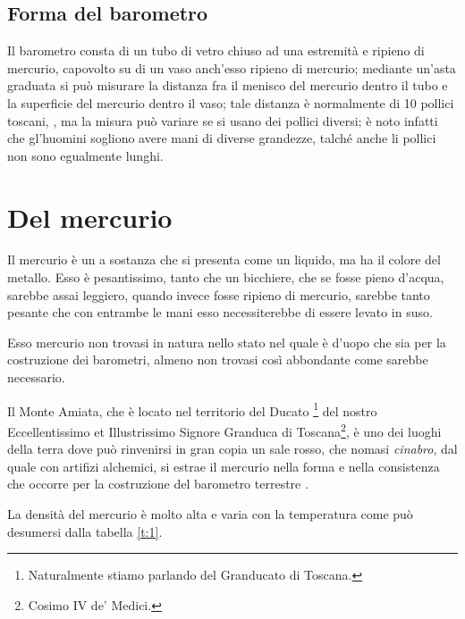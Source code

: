 \documentclass[%
corpo=12pt,
twoside,
stile=standard,
tipotesi=magistrale,
numerazioneromana,
greek,
evenboxes,
]{toptesi}
\begin{document}
{\subsection{Forma del barometro}
Il barometro consta di un tubo di vetro chiuso ad una estremit\`a e
ripieno di mercurio, capovolto su di un vaso anch'esso ripieno di
mercurio; mediante un'asta graduata si pu\`o misurare la distanza fra
il menisco del mercurio dentro il tubo e la superficie del mercurio
dentro il vaso; tale distanza \`e normalmente di 10 pollici toscani,
\cite{tor1,tor2}, ma la misura pu\`o variare se si usano dei pollici
diversi; \`e noto infatti che gl'huomini sogliono avere mani di
diverse grandezze, talch\'e anche li pollici non sono egualmente
lunghi.
\section{Del mercurio}
Il mercurio \`e un a sostanza che si presenta come un liquido, ma ha il colore
del metallo. Esso \`e pesantissimo, tanto che un bicchiere, che se fosse pieno
d'acqua, sarebbe assai leggiero, quando invece fosse ripieno di mercurio,
sarebbe tanto pesante che con entrambe le mani esso necessiterebbe di essere
levato in suso.

Esso mercurio non trovasi in natura nello stato nel quale \`e d'uopo che sia
per la costruzione dei barometri, almeno non trovasi cos\`i abbondante come
sarebbe necessario.

\setcounter{footnote}{25}

Il Monte Amiata, che \`e locato nel territorio del Ducato%
\footnote{Naturalmente stiamo parlando del Granducato di Toscana.%
\ifclassica\NoteWhiteLine\fi
} del nostro Eccellentissimo et Illustrissimo Signore Granduca di Toscana\footnote{Cosimo IV de' Medici.}, \`e uno dei
luoghi della terra dove pu\`o rinvenirsi in gran copia un sale rosso, che
nomasi \emph{cinabro}, dal quale con artifizi alchemici, si estrae il mercurio
nella forma e nella consistenza che occorre per la costruzione del barometro
terrestre%
\ifclassica
{}\fi.


La densit\`a del mercurio \`e molto alta e varia con la temperatura come
pu\`o desumersi dalla tabella \ref{t:1}.


}
\end{document}
